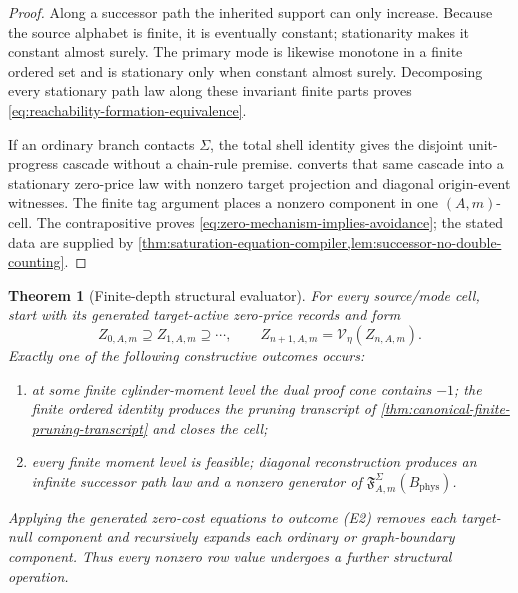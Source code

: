 \documentclass[11pt]{article}
\numberwithin{section}{part}
\theoremstyle{plain}
\newtheorem{theorem}{Theorem}[section]
\theoremstyle{definition}
\theoremstyle{remark}
\newcommand{\Phys}{\mathrm{phys}}
\newcommand{\Budget}{B_{\Phys}}
\begin{document}
\begin{proof}
Along a successor path the inherited support can only increase.  Because the
source alphabet is finite, it is eventually constant; stationarity makes it
constant almost surely.  The primary mode is likewise monotone in a finite
ordered set and is stationary only when constant almost surely.  Decomposing
every stationary path law along these invariant finite
parts proves \eqref{eq:reachability-formation-equivalence}.

If an ordinary branch contacts \(\Sigma\), the total shell identity gives
the disjoint unit-progress cascade without a chain-rule premise.
 converts that same cascade into a
stationary zero-price law with nonzero target projection and diagonal
origin-event witnesses.  The finite tag argument places a nonzero component
in one \((A,m)\)-cell.  The contrapositive proves
\eqref{eq:zero-mechanism-implies-avoidance}; the stated data are supplied by
\cref{thm:saturation-equation-compiler,lem:successor-no-double-counting}.
\end{proof}

\begin{theorem}[Finite-depth structural evaluator]
\label{thm:finite-depth-structural-evaluator}
For every source/mode cell, start with its generated target-active zero-price
records and form
\begin{equation}
 \label{eq:finite-depth-cell-recursion}
 Z_{0,A,m}\supseteq Z_{1,A,m}\supseteq\cdots,
 \qquad
 Z_{n+1,A,m}=\mathcal V_\eta(Z_{n,A,m}).
\end{equation}
Exactly one of the following constructive outcomes occurs:
\begin{enumerate}[label=\textup{(E\arabic*)}]
\item at some finite cylinder-moment level the dual proof cone contains
\(-1\); the finite ordered identity produces the pruning transcript of
\cref{thm:canonical-finite-pruning-transcript} and closes the cell;
\item every finite moment level is feasible; diagonal reconstruction produces
an infinite successor path law and a nonzero generator of
\(\mathfrak F_{A,m}^{\Sigma}(\Budget)\).
\end{enumerate}
Applying the generated zero-cost equations to outcome \textup{(E2)} removes
each target-null component and recursively expands each ordinary or
graph-boundary component.  Thus every nonzero row value undergoes a further
structural operation.
\end{theorem}
\end{document}
